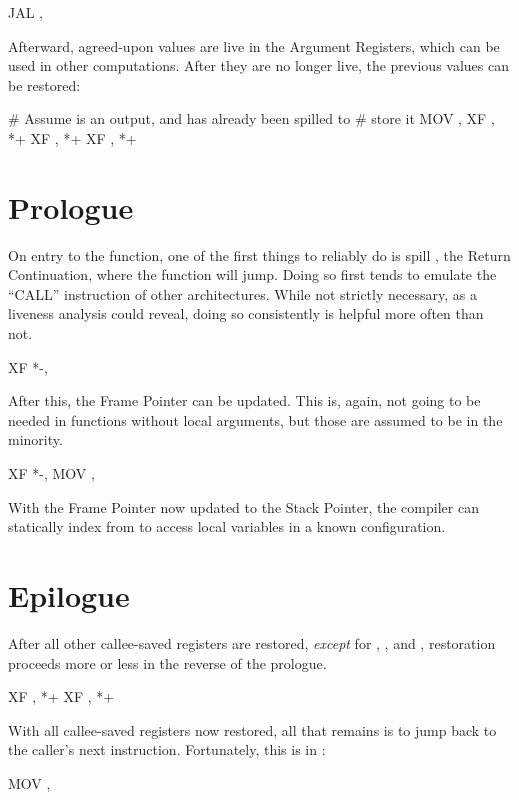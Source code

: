 \startblock
	JAL , 
\endblock

Afterward, agreed-upon values are live in the Argument Registers, which can be
used in other computations. After they are no longer live, the previous values
can be restored:

\startblock
	\# Assume  is an output, and  has already been spilled to
	\# store it
	MOV , 
	XF , *+
	XF , *+
	XF , *+
\endblock

\section{Prologue}

On entry to the function, one of the first things to reliably do is spill
, the Return Continuation, where the function will jump. Doing so first
tends to emulate the ``CALL'' instruction of other architectures. While not
strictly necessary, as a liveness analysis could reveal, doing so consistently
is helpful more often than not.

\startblock
	XF *-, 
\endblock

After this, the Frame Pointer  can be updated. This is, again, not
going to be needed in functions without local arguments, but those are assumed
to be in the minority.

\startblock
	XF *-, 
	MOV , 
\endblock

With the Frame Pointer now updated to the Stack Pointer, the compiler can
statically index from  to access local variables in a known
configuration.

\section{Epilogue}

After all other callee-saved registers are restored, {\it except} for ,
, and , restoration proceeds more or less in the reverse of the
prologue.

\startblock
	XF , *+
	XF , *+
\endblock

With all callee-saved registers now restored, all that remains is to jump back
to the caller's next instruction. Fortunately, this is in :

\startblock
	MOV , 
\endblock

\bye
